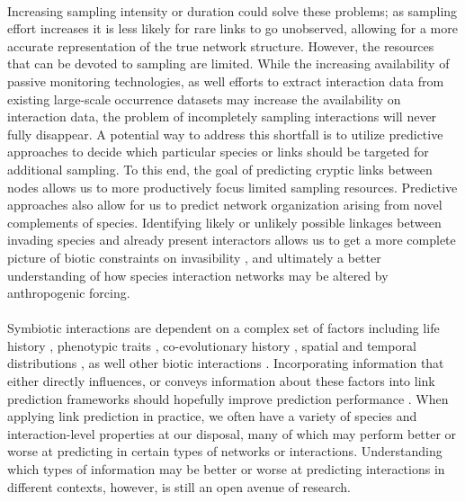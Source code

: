 \documentclass[openacc]{rsproca_new}%
\begin{document}
\paragraph*{}
Increasing sampling intensity or duration could solve these problems; as sampling effort increases it is less likely for rare links to go unobserved, allowing for a more accurate representation of the true network structure. However, the resources that can be devoted to sampling are limited. While the increasing availability of passive monitoring technologies\cite{quintero2022methodological}, as well efforts to extract interaction data from existing large-scale occurrence datasets \cite{putman2021power} may increase the availability on interaction data, the problem of incompletely sampling interactions will never fully disappear. A potential way to address this shortfall is to utilize predictive approaches to decide which particular species or links should be targeted for additional sampling. To this end, the goal of predicting cryptic links between nodes allows us to more productively focus limited sampling resources. Predictive approaches also allow for us to predict network organization arising from novel complements of species. Identifying likely or unlikely possible linkages between invading species and already present interactors allows us to get a more complete picture of biotic constraints on invasibility \cite{minoarivelo2016invading}, and ultimately a better understanding of how species interaction networks may be altered by anthropogenic forcing.  

\paragraph*{}
Symbiotic interactions are dependent on a complex set of factors including life history \cite{ramos2018fruit}, phenotypic traits \cite{rafferty2013}, co-evolutionary history \cite{eriksson2016evolution}, spatial and temporal distributions \cite{fricke2020accelerating, menke2012plant, laurindo2020drivers}, as well other biotic interactions \cite{carreira2020question}. Incorporating information that either directly influences, or conveys information about these factors into link prediction frameworks should hopefully improve prediction performance \cite{dallas2017predicting}. When applying link prediction in practice, we often have a variety of species and interaction-level properties at our disposal, many of which may perform better or worse at predicting in certain types of networks or interactions. Understanding which types of information may be better or worse at predicting interactions in different contexts, however, is still an open avenue of research. 
\end{document}

